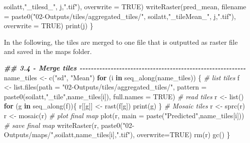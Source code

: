 \documentclass[
  10pt,
  b5paper,
  oneside]{book}
\newenvironment{Shaded}{\begin{snugshade}}{\end{snugshade}}
\newcommand{\AttributeTok}[1]{\textcolor[rgb]{0.77,0.63,0.00}{#1}}
\newcommand{\CommentTok}[1]{\textcolor[rgb]{0.56,0.35,0.01}{\textit{#1}}}
\newcommand{\ConstantTok}[1]{\textcolor[rgb]{0.00,0.00,0.00}{#1}}
\newcommand{\ControlFlowTok}[1]{\textcolor[rgb]{0.13,0.29,0.53}{\textbf{#1}}}
\newcommand{\DocumentationTok}[1]{\textcolor[rgb]{0.56,0.35,0.01}{\textbf{\textit{#1}}}}
\newcommand{\FunctionTok}[1]{\textcolor[rgb]{0.00,0.00,0.00}{#1}}
\newcommand{\NormalTok}[1]{#1}
\newcommand{\OtherTok}[1]{\textcolor[rgb]{0.56,0.35,0.01}{#1}}
\newcommand{\StringTok}[1]{\textcolor[rgb]{0.31,0.60,0.02}{#1}}
\begin{document}
\begin{Shaded}
\begin{Highlighting}[]
\NormalTok{                                soilatt,}\StringTok{"\_tilesd\_"}\NormalTok{, j,}\StringTok{".tif"}\NormalTok{), }
              \AttributeTok{overwrite =} \ConstantTok{TRUE}\NormalTok{)}
  \FunctionTok{writeRaster}\NormalTok{(pred\_mean, }
              \AttributeTok{filename =} \FunctionTok{paste0}\NormalTok{(}\StringTok{"02{-}Outputs/tiles/aggregated\_tiles/"}\NormalTok{,}
\NormalTok{                                soilatt,}\StringTok{"\_tileMean\_"}\NormalTok{, j,}\StringTok{".tif"}\NormalTok{), }
              \AttributeTok{overwrite =} \ConstantTok{TRUE}\NormalTok{)}
  \FunctionTok{print}\NormalTok{(j)}
\NormalTok{\}}
\end{Highlighting}
\end{Shaded}

In the following, the tiles are merged to one file that is outputted as raster file and saved in the maps folder.

\begin{Shaded}
\begin{Highlighting}[]
\DocumentationTok{\#\# 3.4 {-} Merge tiles {-}{-}{-}{-}{-}{-}{-}{-}{-}{-}{-}{-}{-}{-}{-}{-}{-}{-}{-}{-}{-}{-}{-}{-}{-}{-}{-}{-}{-}{-}{-}{-}{-}{-}{-}{-}{-}{-}{-}{-}{-}{-}{-}{-}{-}{-}{-}{-}{-}{-}{-}{-}{-}{-}{-}{-}{-}{-}{-} }
\NormalTok{name\_tiles }\OtherTok{\textless{}{-}} \FunctionTok{c}\NormalTok{(}\StringTok{"sd"}\NormalTok{, }\StringTok{"Mean"}\NormalTok{)}
\ControlFlowTok{for}\NormalTok{ (i }\ControlFlowTok{in} \FunctionTok{seq\_along}\NormalTok{(name\_tiles)) \{}
  \CommentTok{\# list tiles }
\NormalTok{  f }\OtherTok{\textless{}{-}} \FunctionTok{list.files}\NormalTok{(}\AttributeTok{path =} \StringTok{"02{-}Outputs/tiles/aggregated\_tiles/"}\NormalTok{, }
                  \AttributeTok{pattern =} \FunctionTok{paste0}\NormalTok{(soilatt,}\StringTok{"\_tile"}\NormalTok{,name\_tiles[i]), }
                  \AttributeTok{full.names =} \ConstantTok{TRUE}\NormalTok{)}
  \CommentTok{\# read tiles}
\NormalTok{  r }\OtherTok{\textless{}{-}} \FunctionTok{list}\NormalTok{()}
  \ControlFlowTok{for}\NormalTok{ (g }\ControlFlowTok{in} \FunctionTok{seq\_along}\NormalTok{(f))\{}
\NormalTok{    r[[g]] }\OtherTok{\textless{}{-}} \FunctionTok{rast}\NormalTok{(f[g])}
    \FunctionTok{print}\NormalTok{(g)}
\NormalTok{  \}}
  \CommentTok{\# Mosaic tiles}
\NormalTok{  r }\OtherTok{\textless{}{-}} \FunctionTok{sprc}\NormalTok{(r)}
\NormalTok{  r }\OtherTok{\textless{}{-}} \FunctionTok{mosaic}\NormalTok{(r)}
  \CommentTok{\# plot final map}
  \FunctionTok{plot}\NormalTok{(r, }\AttributeTok{main =} \FunctionTok{paste}\NormalTok{(}\StringTok{"Predicted"}\NormalTok{,name\_tiles[i]))}
  \CommentTok{\# save final map}
  \FunctionTok{writeRaster}\NormalTok{(r, }\FunctionTok{paste0}\NormalTok{(}\StringTok{"02{-}Outputs/maps/"}\NormalTok{,soilatt,name\_tiles[i],}\StringTok{".tif"}\NormalTok{),}
              \AttributeTok{overwrite=}\ConstantTok{TRUE}\NormalTok{)}
  \FunctionTok{rm}\NormalTok{(r)}
  \FunctionTok{gc}\NormalTok{()}
\NormalTok{\}}
\end{Highlighting}
\end{Shaded}
\end{document}
